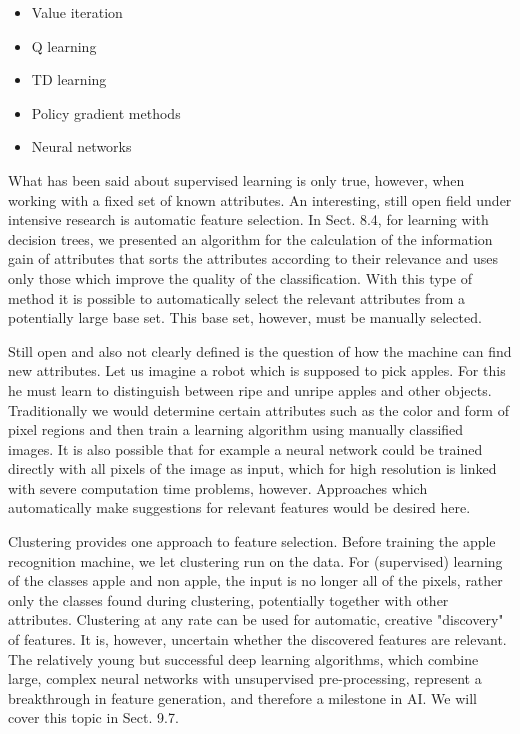 \documentclass[10pt]{article}
\begin{document}
\begin{itemize}
  \item Value iteration
  \item Q learning
  \item TD learning
  \item Policy gradient methods
  \item Neural networks
\end{itemize}

What has been said about supervised learning is only true, however, when working with a fixed set of known attributes. An interesting, still open field under intensive research is automatic feature selection. In Sect. 8.4, for learning with decision trees, we presented an algorithm for the calculation of the information gain of attributes that sorts the attributes according to their relevance and uses only those which improve the quality of the classification. With this type of method it is possible to automatically select the relevant attributes from a potentially large base set. This base set, however, must be manually selected.

Still open and also not clearly defined is the question of how the machine can find new attributes. Let us imagine a robot which is supposed to pick apples. For this he must learn to distinguish between ripe and unripe apples and other objects. Traditionally we would determine certain attributes such as the color and form of pixel regions and then train a learning algorithm using manually classified images. It is also possible that for example a neural network could be trained directly with all pixels of the image as input, which for high resolution is linked with severe computation time problems, however. Approaches which automatically make suggestions for relevant features would be desired here.


Clustering provides one approach to feature selection. Before training the apple recognition machine, we let clustering run on the data. For (supervised) learning of the classes apple and non apple, the input is no longer all of the pixels, rather only the classes found during clustering, potentially together with other attributes. Clustering at any rate can be used for automatic, creative "discovery" of features. It is, however, uncertain whether the discovered features are relevant. The relatively young but successful deep learning algorithms, which combine large, complex neural networks with unsupervised pre-processing, represent a breakthrough in feature generation, and therefore a milestone in AI. We will cover this topic in Sect. 9.7.
\end{document}
